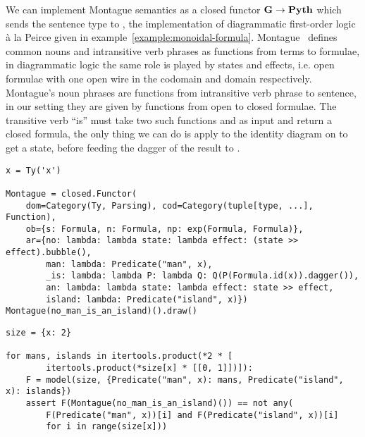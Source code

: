 \begin{example}
We can implement Montague semantics as a closed functor $\mathbf{G} \to \mathbf{Pyth}$ which sends the sentence type to , the implementation of diagrammatic first-order logic à la Peirce given in example~\ref{example:monoidal-formula}.
Montague~\cite{Montague73} defines common nouns and intransitive verb phrases as functions from terms to formulae, in diagrammatic logic the same role is played by states and effects, i.e. open formulae with one open wire  in the codomain and domain respectively.
Montague's noun phrases are functions from intransitive verb phrase to sentence, in our setting they are given by functions from open to closed formulae.
The transitive verb ``is'' must take two such functions  and  as input and return a closed formula, the only thing we can do is apply  to the identity diagram on  to get a state, before feeding the dagger of the result to .

\begin{verbatim}
x = Ty('x')

Montague = closed.Functor(
    dom=Category(Ty, Parsing), cod=Category(tuple[type, ...], Function),
    ob={s: Formula, n: Formula, np: exp(Formula, Formula)},
    ar={no: lambda: lambda state: lambda effect: (state >> effect).bubble(),
        man: lambda: Predicate("man", x),
        _is: lambda: lambda P: lambda Q: Q(P(Formula.id(x)).dagger()),
        an: lambda: lambda state: lambda effect: state >> effect,
        island: lambda: Predicate("island", x)})
Montague(no_man_is_an_island)().draw()
\end{verbatim}


\begin{verbatim}
size = {x: 2}

for mans, islands in itertools.product(*2 * [
        itertools.product(*size[x] * [[0, 1]])]):
    F = model(size, {Predicate("man", x): mans, Predicate("island", x): islands})
    assert F(Montague(no_man_is_an_island)()) == not any(
        F(Predicate("man", x))[i] and F(Predicate("island", x))[i]
        for i in range(size[x]))
\end{verbatim}
\end{example}

